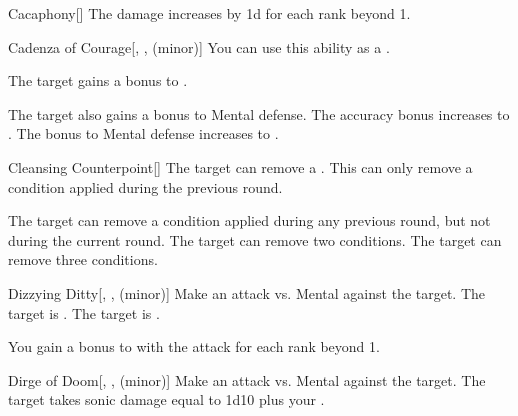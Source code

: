 {\begin{freeability}{Cacaphony}[]
                \rankline
                The damage increases by \plus1d for each rank beyond 1.
            \end{freeability}

            \begin{freeability}{Cadenza of Courage}[, ,  (minor)]
                You can use this ability as a .

                The target gains a  bonus to .

                \rankline
                 The target also gains a  bonus to Mental defense.
                 The accuracy bonus increases to .
                 The bonus to Mental defense increases to .
            \end{freeability}

            \begin{freeability}{Cleansing Counterpoint}[]
                The target can remove a .
                This can only remove a condition applied during the previous round.

                \rankline
                 The target can remove a condition applied during any previous round, but not during the current round.
                 The target can remove two conditions.
                 The target can remove three conditions.
            \end{freeability}

            \begin{freeability}{Dizzying Ditty}[, ,  (minor)]
                Make an attack vs. Mental against the target.
                \hit The target is .
                \crit The target is .

                \rankline
                You gain a  bonus to  with the attack for each rank beyond 1.
            \end{freeability}

            \begin{freeability}{Dirge of Doom}[, ,  (minor)]
                Make an attack vs. Mental against the target.
                \hit The target takes sonic damage equal to 1d10 plus your .


\end{freeability}}
